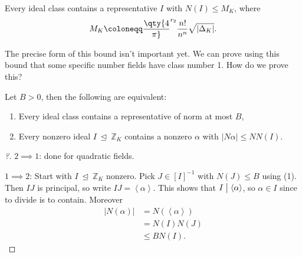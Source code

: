 \begin{proposition}

Every ideal class contains a representative \(I\) with
\(N(I) \leq M_K\), where
\begin{align*}
M_K \coloneqq\qty{4\over \pi}^{r_2} {n! \over n^n} \sqrt{{\left\lvert {{\Delta}_K} \right\rvert}}
.\end{align*}

\end{proposition}

\begin{remark}

The precise form of this bound isn't important yet. We can prove using
this bound that some specific number fields have class number 1. How do
we prove this?

\end{remark}

\begin{lemma}[?]

Let \(B>0\), then the following are equivalent:

\begin{enumerate}
\def\labelenumi{\arabic{enumi}.}
\item
  Every ideal class contains a representative of norm at most \(B\),
\item
  Every nonzero ideal \(I{~\trianglelefteq~}{\mathbb{Z}}_K\) contains a
  nonzero \(\alpha\) with
  \({\left\lvert {N \alpha} \right\rvert} \leq N N(I)\).
\end{enumerate}

\end{lemma}

\begin{proof}[?]

\(2\implies 1\): done for quadratic fields.

\(1\implies 2\): Start with \(I{~\trianglelefteq~}{\mathbb{Z}}_K\)
nonzero. Pick \(J \in [I]^{-1}\) with \(N(J) \leq B\) using (1). Then
\(IJ\) is principal, so write
\(IJ = \left\langle{ \alpha }\right\rangle\). This shows that
\(I \bigm|\left\langle{ \alpha }\right\rangle\), so \(\alpha\in I\)
since to divide is to contain. Moreover
\begin{align*}
{\left\lvert {N ( \alpha)} \right\rvert} 
&= N( \left\langle{ \alpha }\right\rangle ) \\
&= N(I) N(J) \\
&\leq B N(I)
.\end{align*}

\end{proof}


